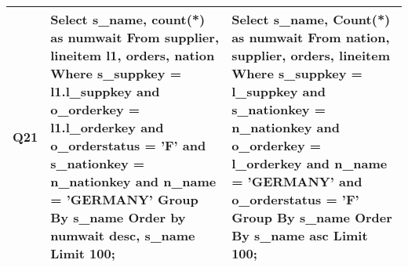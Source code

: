 {\begin{longtable}{|p{0.5cm}|p{7cm}|p{7cm}|}
Q21&
Select s\_name, count(*) as numwait From supplier, lineitem l1, orders, nation Where s\_suppkey = l1.l\_suppkey and o\_orderkey = l1.l\_orderkey and o\_orderstatus = 'F' and s\_nationkey = n\_nationkey and n\_name = 'GERMANY' Group By s\_name Order by numwait desc, s\_name Limit 100;&
Select s\_name, Count(*) as numwait From nation, supplier, orders, lineitem Where s\_suppkey = l\_suppkey and s\_nationkey = n\_nationkey and o\_orderkey = l\_orderkey and n\_name  = 'GERMANY' and o\_orderstatus  = 'F' Group By s\_name Order By s\_name asc Limit 100;\\\hline
\end{longtable}}